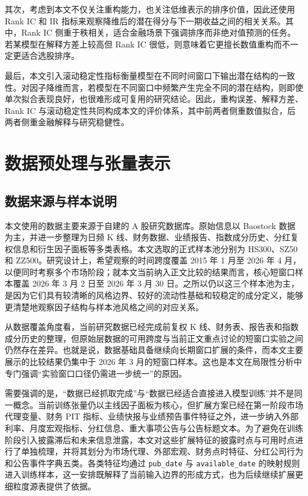 其次，考虑到本文不仅关注重构能力，也关注低维表示的排序价值，因此还使用 Rank IC 和 IR 指标来观察降维后的潜在得分与下一期收益之间的相关关系。其中，Rank IC 侧重于秩相关，适合金融场景下强调排序而非绝对值预测的任务。若某模型在解释方差上较高但 Rank IC 很低，则意味着它更擅长数值重构而不一定更适合选股排序。

最后，本文引入滚动稳定性指标衡量模型在不同时间窗口下输出潜在结构的一致性。对因子降维而言，若模型在不同窗口中频繁产生完全不同的潜在结构，则即使单次拟合表现良好，也很难形成可复用的研究结论。因此，重构误差、解释方差、Rank IC 与滚动稳定性共同构成本文的评价体系，其中前两者侧重数值拟合，后两者侧重金融解释与研究稳健性。

\chapter{数据预处理与张量表示}

\section{数据来源与样本说明}

本文使用的数据主要来源于自建的 A 股研究数据库。原始信息以 Baostock 数据为主，并进一步整理为日频 K 线、财务数据、业绩报告、指数成分历史、分红复权信息和衍生因子面板等多类表格。本文选取的正式样本池分别为 HS300、SZ50 和 ZZ500。研究设计上，希望观察的时间跨度覆盖 2015 年 1 月至 2026 年 4 月，以便同时考察多个市场阶段；就本文当前纳入正文比较的结果而言，核心短窗口样本覆盖 2026 年 3 月 2 日至 2026 年 3 月 30 日。之所以仍以这三个样本池为主，是因为它们具有较清晰的风格边界、较好的流动性基础和较稳定的成分定义，能够更清楚地观察因子结构与样本池风格之间的对应关系。

从数据覆盖角度看，当前研究数据已经完成前复权 K 线、财务表、报告表和指数成分历史的整理，但原始层数据的可用跨度与当前正文重点讨论的短窗口实验之间仍然存在差异。也就是说，数据基础具备继续向长期窗口扩展的条件，而本文主要展示的比较结果仍集中于 2026 年 3 月的短窗口样本。这也是本文在局限性分析中专门强调“实验窗口口径仍需进一步统一”的原因。

需要强调的是，“数据已经抓取完成”与“数据已经适合直接进入模型训练”并不是同一概念。当前训练张量仍以主线因子面板为核心，但扩展方案已经在第一阶段市场代理变量、财务 PIT 指标、业绩快报与业绩预告事件特征之外，进一步纳入外部利率、月度宏观指标、分红信息、重大事项公告与公告标题文本。为了避免在训练阶段引入披露滞后和未来信息泄露，本文对这些扩展特征的披露时点与可用时点进行了单独梳理，并将其划分为市场代理、外部宏观、财务点时特征、分红公司行为和公告事件字典五类。各类特征均通过 \texttt{pub\_date} 与 \texttt{available\_date} 的映射规则进入训练样本，这一安排既解释了当前输入边界的形成方式，也为后续继续扩展更细粒度源表提供了依据。

